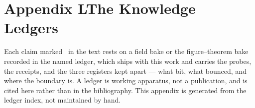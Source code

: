 \clearpage
\section*{Appendix L\quad The Knowledge Ledgers}\label{app:ledgers}
\small\noindent Each claim marked \ldgmarker\ in the text rests on a field bake or the figure--theorem bake recorded in the named ledger, which ships with this work and carries the probes, the receipts, and the three registers kept apart --- what bit, what bounced, and where the boundary is. A ledger is working apparatus, not a publication, and is cited here rather than in the bibliography. This appendix is generated from the ledger index, not maintained by hand.\par\medskip
\begingroup\renewcommand{\arraystretch}{1.25}
